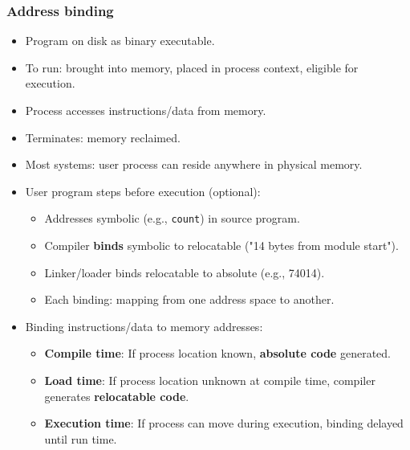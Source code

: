 \subsubsection*{Address binding}
\begin{itemize}
    \item Program on disk as binary executable.
    \item To run: brought into memory, placed in process context, eligible for execution.
    \item Process accesses instructions/data from memory.
    \item Terminates: memory reclaimed.
    \item Most systems: user process can reside anywhere in physical memory.
    \item User program steps before execution (optional):
    \begin{itemize}
        \item Addresses symbolic (e.g., \texttt{count}) in source program.
        \item Compiler \textbf{binds} symbolic to relocatable ("14 bytes from module start").
        \item Linker/loader binds relocatable to absolute (e.g., 74014).
        \item Each binding: mapping from one address space to another.
    \end{itemize}
    \item Binding instructions/data to memory addresses:
    \begin{itemize}
        \item \textbf{Compile time}: If process location known, \textbf{absolute code} generated.
        \item \textbf{Load time}: If process location unknown at compile time, compiler generates \textbf{relocatable code}.
        \item \textbf{Execution time}: If process can move during execution, binding delayed until run time.
    \end{itemize}
\end{itemize}

